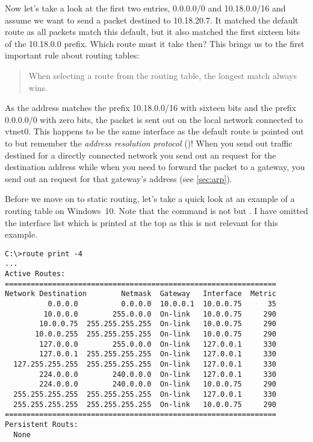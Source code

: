 Now let's take a look at the first two entries, 0.0.0.0/0 and 10.18.0.0/16 and assume we want to send a packet destined to 10.18.20.7.
It matched the default route as all packets match this default, but it also matched the first sixteen bits of the 10.18.0.0 prefix.
Which route must it take then?
This brings us to the first important rule about routing tables:

\begin{quote}
   When selecting a route from the routing table, the longest match always wins.
\end{quote}

As the  address matches the prefix 10.18.0.0/16 with sixteen bits and the prefix 0.0.0.0/0 with zero bits, the packet is sent out on the local network connected to vtnet0.
This happens to be the same interface as the default route is pointed out to but remember the \emph{address resolution protocol} ()!
When you send out traffic destined for a directly connected network you send out an  request for the destination  address while when you need to forward the packet to a gateway, you send out an  request for that gateway's  address (see \vref{sec:arp}).

Before we move on to static routing, let's take a quick look at an example of a routing table on Windows~10.
Note that the command is not  but .
I have omitted the interface list which is printed at the top as this is not relevant for this example.

\begin{verbatim}
C:\>route print -4
...
Active Routes:
===============================================================
Network Destination        Netmask  Gateway   Interface  Metric
          0.0.0.0          0.0.0.0  10.0.0.1  10.0.0.75      35
         10.0.0.0        255.0.0.0  On-link   10.0.0.75     290
        10.0.0.75  255.255.255.255  On-link   10.0.0.75     290
       10.0.0.255  255.255.255.255  On-link   10.0.0.75     290
        127.0.0.0        255.0.0.0  On-link   127.0.0.1     330
        127.0.0.1  255.255.255.255  On-link   127.0.0.1     330
  127.255.255.255  255.255.255.255  On-link   127.0.0.1     330
        224.0.0.0        240.0.0.0  On-link   127.0.0.1     330
        224.0.0.0        240.0.0.0  On-link   10.0.0.75     290
  255.255.255.255  255.255.255.255  On-link   127.0.0.1     330
  255.255.255.255  255.255.255.255  On-link   10.0.0.75     290
===============================================================
Persistent Routs:
  None
\end{verbatim}




